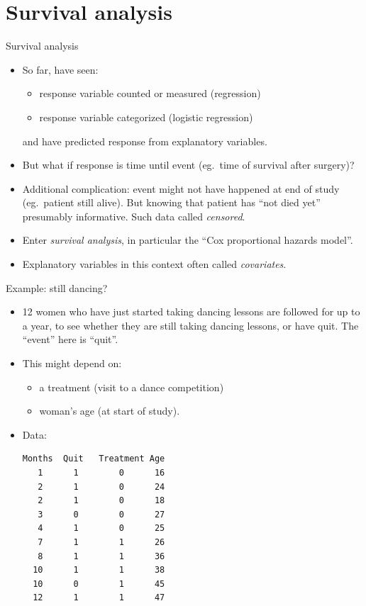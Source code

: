 \section{Survival analysis}
\frame{\sectionpage}

\begin{frame}[fragile]{Survival analysis}

  \begin{itemize}
  \item So far, have seen:
    \begin{itemize}
    \item response variable counted or measured (regression)
    \item response variable categorized (logistic regression)
    \end{itemize}
    and have predicted response from explanatory variables.
  \item But what if response is time until event (eg.\ time of
    survival after surgery)?
  \item Additional complication: event might not have happened at end of study (eg.\ patient still alive). But knowing that patient has ``not died yet'' presumably informative. Such data called {\em censored}. 
  \item Enter {\em survival analysis}, in particular the ``Cox proportional hazards model''. 
  \item Explanatory variables in this context often called {\em covariates}.
  \end{itemize}

\end{frame}

\begin{frame}[fragile]{Example: still dancing?}

  \begin{itemize}
  \item 12 women who have just started taking dancing lessons are
    followed for up to a year, to see whether they are still taking
    dancing lessons, or have quit. The ``event'' here is ``quit''.
  \item This might depend on:
    \begin{itemize}
    \item a treatment (visit to a dance competition)
    \item woman's age (at start of study).
    \end{itemize}
  \item Data:

{\scriptsize
\begin{verbatim}
Months  Quit   Treatment Age
   1      1        0      16
   2      1        0      24
   2      1        0      18
   3      0        0      27
   4      1        0      25
   7      1        1      26
   8      1        1      36
  10      1        1      38
  10      0        1      45
  12      1        1      47
\end{verbatim}
}

  \end{itemize}
  
\end{frame}
 
